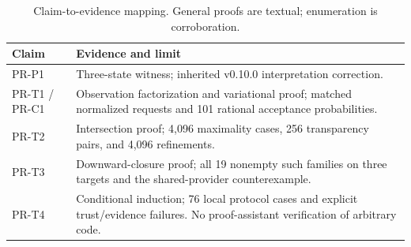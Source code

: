 \begin{table}[h]
\centering\small
\caption{Claim-to-evidence mapping. General proofs are textual; enumeration is corroboration.}
\begin{tabularx}{\linewidth}{@{}lX@{}}
\toprule
Claim & Evidence and limit\\\midrule
PR-P1 & Three-state witness; inherited v0.10.0 interpretation correction.\\
PR-T1 / PR-C1 & Observation factorization and variational proof; matched normalized requests and 101 rational acceptance probabilities.\\
PR-T2 & Intersection proof; 4,096 maximality cases, 256 transparency pairs, and 4,096 refinements.\\
PR-T3 & Downward-closure proof; all 19 nonempty such families on three targets and the shared-provider counterexample.\\
PR-T4 & Conditional induction; 76 local protocol cases and explicit trust/evidence failures. No proof-assistant verification of arbitrary code.\\
\bottomrule
\end{tabularx}
\end{table}

